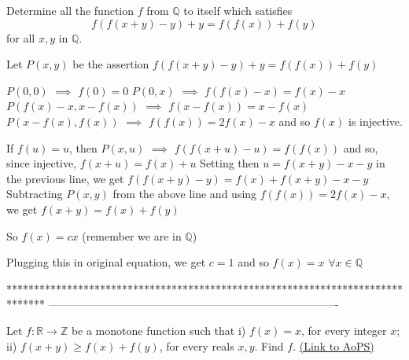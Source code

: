 \begin{solution}
	\begin{tcolorbox}Determine all the function $f$ from $\mathbb{Q}$ to itself which satisfies\[f(f(x+y)-y)+y=f(f(x))+f(y)\]for all $x,y$ in $\mathbb{Q}$.\end{tcolorbox}
Let $P(x,y)$ be the assertion $f(f(x+y)-y)+y=f(f(x))+f(y)$

$P(0,0)$ $\implies$ $f(0)=0$
$P(0,x)$ $\implies$ $f(f(x)-x)=f(x)-x$
$P(f(x)-x,x-f(x))$ $\implies$ $f(x-f(x))=x-f(x)$
$P(x-f(x),f(x))$ $\implies$ $f(f(x))=2f(x)-x$ and so $f(x)$ is injective.

If $f(u)=u$, then $P(x,u)$ $\implies$ $f(f(x+u)-u)=f(f(x))$ and so, since injective,  $f(x+u)=f(x)+u$ 
Setting then $u=f(x+y)-x-y$ in the previous line, we get $f(f(x+y)-y)=f(x)+f(x+y)-x-y$
Subtracting $P(x,y)$ from the above line and using $f(f(x))=2f(x)-x$, we get $f(x+y)=f(x)+f(y)$

So $f(x)=cx$ (remember we are in $\mathbb Q$) 

Plugging this in original equation, we get $c=1$ and so $\boxed{f(x)=x}$ $\forall x\in\mathbb Q$
\end{solution}
*******************************************************************************
-------------------------------------------------------------------------------

\begin{problem}
	Let $f:\mathbb{R} \rightarrow \mathbb{Z}$ be a monotone function such that
i) $f(x)=x$, for every integer $x$;
ii) $f(x+y) \ge f(x)+f(y)$, for every reals $x,y$.
Find $f$.
	\flushright \href{https://artofproblemsolving.com/community/c6h478972}{(Link to AoPS)}
\end{problem}



